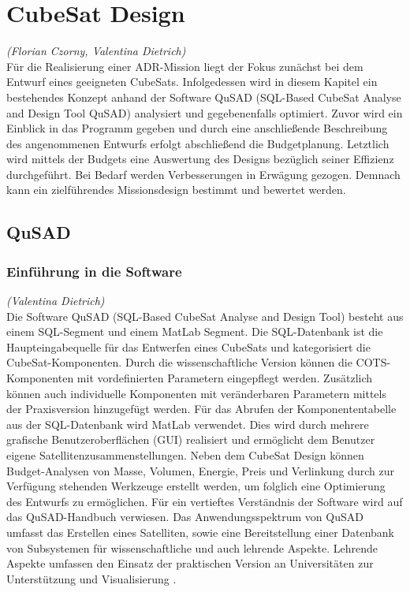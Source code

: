 \chapter{CubeSat Design}
\hfill\emph{(Florian Czorny, Valentina Dietrich)}\\
Für die Realisierung einer ADR-Mission liegt der Fokus zunächst bei dem Entwurf eines geeigneten CubeSats. Infolgedessen wird in diesem Kapitel ein bestehendes Konzept \cite{Lettau.} anhand der Software QuSAD (SQL-Based CubeSat Analyse and Design Tool QuSAD) analysiert und gegebenenfalls optimiert. Zuvor wird ein Einblick in das Programm gegeben und durch eine anschließende Beschreibung des angenommenen Entwurfs erfolgt abschließend die Budgetplanung. Letztlich wird mittels der Budgets eine Auswertung des Designs bezüglich seiner Effizienz durchgeführt. Bei Bedarf werden Verbesserungen in Erwägung gezogen. Demnach kann ein zielführendes Missionsdesign bestimmt und bewertet werden.
		
		\section{QuSAD}
			
			\subsection{Einführung in die Software}
	\hfill\emph{(Valentina Dietrich)}\\
Die Software QuSAD (SQL-Based CubeSat Analyse and Design Tool) besteht aus einem SQL-Segment und einem MatLab Segment. Die SQL-Datenbank ist die Haupteingabequelle für das Entwerfen eines CubeSats und kategorisiert die CubeSat-Komponenten. Durch die wissenschaftliche Version können die COTS-Komponenten mit vordefinierten Parametern eingepflegt werden. Zusätzlich können auch individuelle Komponenten mit veränderbaren Parametern mittels der Praxisversion hinzugefügt werden. Für das Abrufen der Komponententabelle aus der SQL-Datenbank wird MatLab verwendet. Dies wird durch mehrere grafische Benutzeroberflächen (GUI) realisiert und ermöglicht dem Benutzer eigene Satellitenzusammenstellungen. Neben dem CubeSat Design können Budget-Analysen von Masse, Volumen, Energie, Preis und Verlinkung durch zur Verfügung stehenden Werkzeuge erstellt werden, um folglich eine Optimierung des Entwurfs zu ermöglichen. Für ein vertieftes Verständnis der Software wird auf das QuSAD-Handbuch \cite{Farahvashi.} verwiesen. Das Anwendungsspektrum von QuSAD umfasst das Erstellen eines Satelliten, sowie eine Bereitstellung einer Datenbank von Subsystemen für wissenschaftliche und auch lehrende Aspekte. Lehrende Aspekte umfassen den Einsatz der praktischen Version an Universitäten zur Unterstützung und Visualisierung \cite{Farahvashi.b}. 
			
